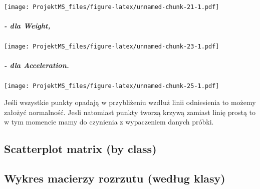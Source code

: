 \documentclass[
]{article}
\newenvironment{Shaded}{\begin{snugshade}}{\end{snugshade}}
\newcommand{\DataTypeTok}[1]{\textcolor[rgb]{0.13,0.29,0.53}{#1}}
\newcommand{\DecValTok}[1]{\textcolor[rgb]{0.00,0.00,0.81}{#1}}
\newcommand{\KeywordTok}[1]{\textcolor[rgb]{0.13,0.29,0.53}{\textbf{#1}}}
\newcommand{\NormalTok}[1]{#1}
\newcommand{\OperatorTok}[1]{\textcolor[rgb]{0.81,0.36,0.00}{\textbf{#1}}}
\newcommand{\OtherTok}[1]{\textcolor[rgb]{0.56,0.35,0.01}{#1}}
\newcommand{\StringTok}[1]{\textcolor[rgb]{0.31,0.60,0.02}{#1}}
\begin{document}
\texttt{[image: ProjektMS\_files/figure-latex/unnamed-chunk-21-1.pdf]}

\hypertarget{dla-weight}{%
\subparagraph{- dla Weight,}\label{dla-weight}}

\begin{Shaded}
\end{Shaded}

\texttt{[image: ProjektMS\_files/figure-latex/unnamed-chunk-23-1.pdf]}

\hypertarget{dla-acceleration.}{%
\subparagraph{- dla Acceleration.}\label{dla-acceleration.}}

\begin{Shaded}
\end{Shaded}

\texttt{[image: ProjektMS\_files/figure-latex/unnamed-chunk-25-1.pdf]}

Jeśli wszystkie punkty opadają w przybliżeniu wzdłuż linii odniesienia
to możemy założyć normalność. Jesli natomiast punkty tworzą krzywą
zamiast linię prostą to w tym momencie mamy do czynienia z wypaczeniem
danych próbki.

\hypertarget{scatterplot-matrix-by-class}{%
\subsection{Scatterplot matrix (by
class)}\label{scatterplot-matrix-by-class}}

\hypertarget{wykres-macierzy-rozrzutu-wedux142ug-klasy}{%
\subsection{Wykres macierzy rozrzutu (według
klasy)}\label{wykres-macierzy-rozrzutu-wedux142ug-klasy}}
\end{document}
